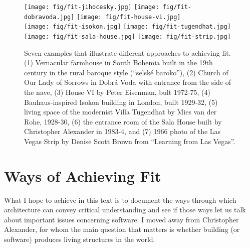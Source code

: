 \begin{figure}[t]
\vspace{-1em}
\texttt{[image: fig/fit-jihocesky.jpg]}\quad
\texttt{[image: fig/fit-dobravoda.jpg]}\quad
\texttt{[image: fig/fit-house-vi.jpg]}\\[1em]
\texttt{[image: fig/fit-isokon.jpg]}\quad
\texttt{[image: fig/fit-tugendhat.jpg]}\\[1em]
\texttt{[image: fig/fit-sala-house.jpg]}\quad
\texttt{[image: fig/fit-strip.jpg]}\quad
\caption{Seven examples that illustrate different approaches to achieving fit.
(1) Vernacular farmhouse in South Bohemia built in the 19th century in the rural baroque style (``selské baroko''),
(2) Church of Our Lady of Sorrows in Dobrá Voda with entrance from the side of the nave,
(3) House VI by Peter Eisenman, bult 1972-75,
(4) Bauhaus-inspired Isokon building in London, built 1929-32,
(5) living space of the modernist Villa Tugendhat by Mies van der Rohe, 1928-30,
(6) the entrance room of the Sala House built by Christopher Alexander in 1983-4, and
(7) 1966 photo of the Las Vegas Strip by Denise Scott Brown from ``Learning from Las Vegas''.}
\label{fig:fit}
\end{figure}

\section{Ways of Achieving Fit}
What I hope to achieve in this text is to document the ways through which architecture can convey
critical understanding and see if those ways let us talk about important issues concerning software. I moved
away from Christopher Alexander, for whom the main question that matters is whether building (or software)
produces living structures in the world.

